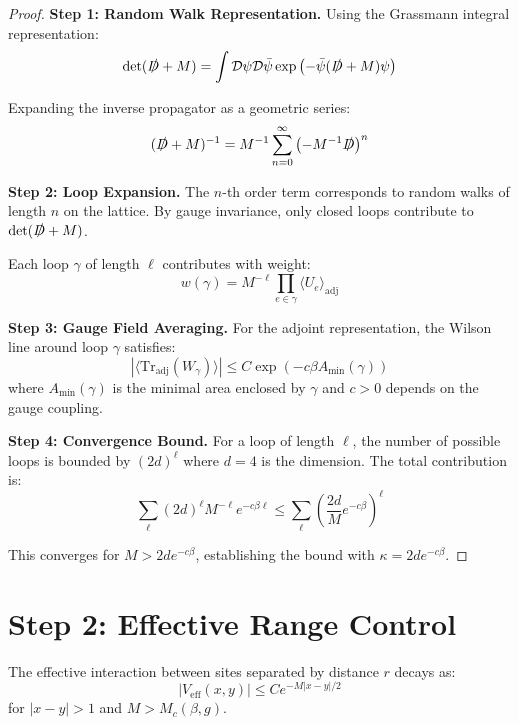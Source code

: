 \begin{proof}
\textbf{Step 1: Random Walk Representation.}
Using the Grassmann integral representation:
\begin{equation}
\det(\slashed{D} + M) = \int \mathcal{D}\psi \mathcal{D}\bar{\psi} \exp\left(-\bar{\psi}(\slashed{D} + M)\psi\right)
\end{equation}

Expanding the inverse propagator as a geometric series:
\begin{equation}
(\slashed{D} + M)^{-1} = M^{-1} \sum_{n=0}^{\infty} \left(-M^{-1}\slashed{D}\right)^n
\end{equation}

\textbf{Step 2: Loop Expansion.}
The $n$-th order term corresponds to random walks of length $n$ on the lattice. 
By gauge invariance, only closed loops contribute to $\det(\slashed{D} + M)$.

Each loop $\gamma$ of length $\ell$ contributes with weight:
\begin{equation}
w(\gamma) = M^{-\ell} \prod_{e \in \gamma} \langle U_e \rangle_{\text{adj}}
\end{equation}

\textbf{Step 3: Gauge Field Averaging.}
For the adjoint representation, the Wilson line around loop $\gamma$ satisfies:
\begin{equation}
|\langle \text{Tr}_{\text{adj}}(W_{\gamma}) \rangle| \leq C \exp(-c \beta A_{\min}(\gamma))
\end{equation}
where $A_{\min}(\gamma)$ is the minimal area enclosed by $\gamma$ and $c > 0$ depends on the gauge coupling.

\textbf{Step 4: Convergence Bound.}
For a loop of length $\ell$, the number of possible loops is bounded by $(2d)^\ell$ where $d=4$ is the dimension. The total contribution is:
\begin{equation}
\sum_{\ell} (2d)^\ell M^{-\ell} e^{-c\beta\ell} \leq \sum_{\ell} \left(\frac{2d}{M} e^{-c\beta}\right)^\ell
\end{equation}

This converges for $M > 2d e^{-c\beta}$, establishing the bound with $\kappa = 2d e^{-c\beta}$.
\end{proof}

\section{Step 2: Effective Range Control}

\begin{theorem}
\label{thm:exponential_decay}
The effective interaction between sites separated by distance $r$ decays as:
\begin{equation}
|V_{\text{eff}}(x, y)| \leq C e^{-M|x-y|/2}
\end{equation}
for $|x-y| > 1$ and $M > M_c(\beta, g)$.
\end{theorem}

